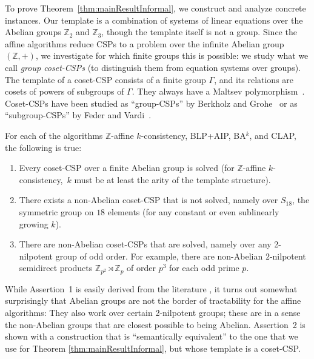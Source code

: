 \documentclass[a4paper,english, thm-restate]{lipics-v2021}
\newcommand{\bbZ}{\mathbb{Z}}
\newcommand{\Sym}[1]{S_{#1}}
\begin{document}
	To prove Theorem~\ref{thm:mainResultInformal},
	we construct and analyze  concrete instances. 
	Our template is a combination of systems of linear equations over the Abelian groups $\bbZ_2$ and $\bbZ_3$, though the template itself is not a group.
	Since the affine algorithms reduce CSPs to a problem over the infinite Abelian group $(\bbZ,+)$, 
	we investigate for which finite groups this is possible:
	we study what we call \emph{group coset-CSPs} (to distinguish them from equation systems over groups).
	The template of a coset-CSP consists of a finite group $\Gamma$, and its relations are cosets of powers of subgroups of $\Gamma$.
	They always have a Maltsev polymorphism~\cite{BerkholzGrohe2015}.
Coset-CSPs have been studied as ``group-CSPs'' by Berkholz and Grohe~\cite{BerkholzGrohe2015, BerkholzGrohe2017} or as ``subgroup-CSPs'' by Feder and Vardi~\cite{feder1993monotone}. 
	\begin{theorem}
		\label{thm:mainPowerOnGroupCSPs}	
		For each of the algorithms $\bbZ$-affine $k$-consistency, BLP+AIP, BA$^k$, and CLAP, the following is true:
		\begin{enumerate}
			\item Every coset-CSP over a finite Abelian group is solved (for $\bbZ$-affine $k$-consistency,~$k$ must be at least the arity of the template structure). \label{itm:powerOnGroupsSolveAbelian}
			\item There exists a non-Abelian coset-CSP that is not solved, namely over $\Sym{18}$, the symmetric group on $18$ elements (for any constant or even sublinearly growing $k$).\label{itm:powerOnGroupsDontSolveNonAbelian}
			\item There are non-Abelian coset-CSPs that are solved, namely over any 2-nilpotent group of odd order. For example, there are non-Abelian $2$-nilpotent  semidirect products $\bbZ_{p^2} \rtimes \bbZ_p$ of order $p^3$ for each odd prime $p$. \label{itm:powerOnGroupsSolveSomeNonAbelian}
		\end{enumerate}
	\end{theorem}
	\noindent While Assertion~1 is easily derived from the literature \cite{OConghaile22, BartoBKO2021}, it turns out somewhat surprisingly
	that Abelian groups are not the border of tractability for the affine algorithms:
	They also work over certain 2-nilpotent groups; these are in a sense the non-Abelian groups that are closest possible to being Abelian.
	Assertion~2 is shown
	with a construction that is ``semantically equivalent''
	to the one that we use for Theorem \ref{thm:mainResultInformal}, but whose template is a coset-CSP.
\end{document}

